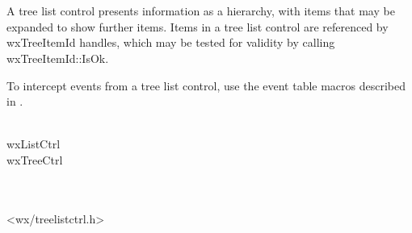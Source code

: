 
\section{}\label{wxtreelistctrl}

A tree list control presents information as a hierarchy, with items that may be expanded
to show further items. Items in a tree list control are referenced by wxTreeItemId handles,
which may be tested for validity by calling wxTreeItemId::IsOk.

To intercept events from a tree list control, use the event table macros described in .


\\
wxListCtrl\\
wxTreeCtrl\\
\\
\\


<wx/treelistctrl.h>


